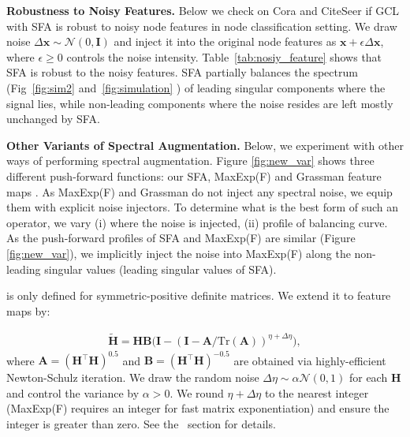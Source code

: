 \noindent\textbf{Robustness to Noisy Features.}
Below we check on Cora and CiteSeer if GCL with SFA is robust to noisy node features in node classification setting. 
We draw noise $\Delta\mathbf{x} \sim \mathcal{N}(0,\mathbf{I})$ and inject it into the original node features as   $\mathbf{x}+\epsilon\Delta\mathbf{x}$, where $\epsilon\!\geq\!0$ controls the noise intensity.  Table~\ref{tab:nosiy_feature} shows that  SFA is robust to the noisy features. SFA partially balances the spectrum (Fig~\ref{fig:sim2} and~\ref{fig:simulation} ) of leading singular components where the signal lies, while non-leading components where the noise resides are left mostly unchanged by SFA.  %

\vspace{0.1cm}
\noindent\textbf{Other Variants of Spectral Augmentation.} Below, we experiment with other ways of performing spectral augmentation. Figure \ref{fig:new_var} shows three different push-forward functions: our SFA, MaxExp(F) \cite{maxexp} and Grassman feature maps   \cite{mehrtash_dict_manifold}. As MaxExp(F) and Grassman do not inject any spectral noise, we equip them with explicit noise injectors. To determine what is the best form of such an operator, we vary (i) where the noise is injected, (ii) profile of balancing curve. As  the push-forward profiles of SFA and MaxExp(F) are similar (Figure \ref{fig:new_var}), we implicitly inject the noise into MaxExp(F) along the non-leading singular values (\cf leading singular values of SFA).

\vspace{0.1cm}
 is only defined for symmetric-positive definite matrices. We extend it to feature maps by:

\vspace{-0.3cm}
\begin{equation}
\begin{aligned}
         \widetilde{\mathbf{H}} \!=\! \mathbf{H}\mathbf{B}\big(\mathbf{I}-(\mathbf{I}-\mathbf{A}/\text{Tr}(\mathbf{A}))^{\eta+\Delta\eta}\big),
    \end{aligned}
    \label{eq:maxexp}
\end{equation}
%
where $\mathbf{A}=(\mathbf{H}^\top\mathbf{H})^{0.5}$ and $\mathbf{B}=(\mathbf{H}^\top\mathbf{H})^{-0.5}$ are obtained via highly-efficient Newton-Schulz iteration. We draw the random noise  $\Delta\eta\!\sim\!\alpha\mathcal{N}(0,1)$ for each $\mathbf{H}$ and control the variance by $\alpha\!>\!0$. We round $\eta+\Delta\eta$ to the nearest integer (MaxExp(F) requires an integer for fast matrix exponentiation) and ensure the integer is greater than zero. See  the ~section for details.



